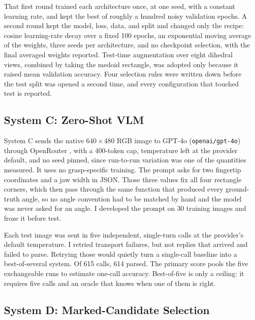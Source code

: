 \documentclass[10pt,conference]{IEEEtran}
\begin{document}
That first round trained each architecture once, at one seed, with a
constant learning rate, and kept the best of roughly a hundred noisy
validation epochs. A second round kept the model, loss, data, and split and
changed only the recipe: cosine learning-rate decay over a fixed 100 epochs,
an exponential moving average of the weights, three seeds per architecture,
and no checkpoint selection, with the final averaged weights reported.
Test-time augmentation over eight dihedral views, combined by taking the
medoid rectangle, was adopted only because it raised mean validation
accuracy. Four selection rules were written down before the test split was
opened a second time, and every configuration that touched test is reported.

\subsection{System C: Zero-Shot VLM}

System C sends the native $640\times480$ RGB image to GPT-4o
(\texttt{openai/gpt-4o}) through OpenRouter \cite{openai2024}, with a
400-token cap, temperature left at the provider default, and no seed
pinned, since run-to-run variation was one of the quantities measured. It uses no grasp-specific training. The prompt asks for two
fingertip coordinates and a jaw width in JSON. Those three values fix all
four rectangle corners, which then pass through the same function that
produced every ground-truth angle, so no angle convention had to be matched
by hand and the model was never asked for an angle. I developed the prompt on 30 training images and froze it before
test.

Each test image was sent in five independent, single-turn calls at the
provider's default temperature. I retried transport failures, but not replies
that arrived and failed to parse. Retrying those would quietly turn a
single-call baseline into a best-of-several system. Of 615 calls, 614 parsed.
The primary score pools the five exchangeable runs to estimate one-call
accuracy. Best-of-five is only a ceiling: it requires five calls and an oracle
that knows when one of them is right.

\subsection{System D: Marked-Candidate Selection}
\end{document}
